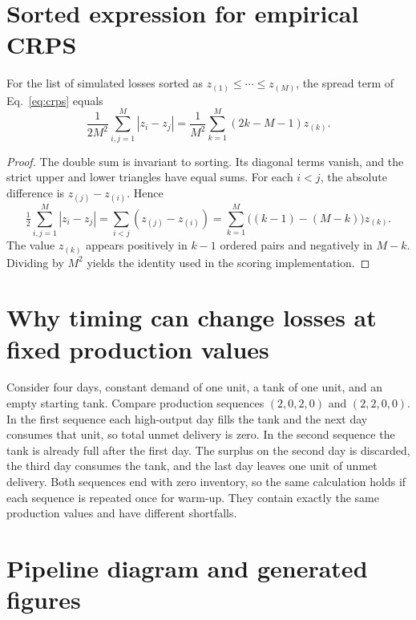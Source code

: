 \section{Sorted expression for empirical CRPS}
\label{app:crps}

\begin{proposition}
For the list of simulated losses sorted as $z_{(1)}\leq\cdots\leq z_{(M)}$, the spread term of Eq.~\eqref{eq:crps} equals
\[
\frac{1}{2M^2}\sum_{i,j=1}^{M}|z_i-z_j|
=\frac{1}{M^2}\sum_{k=1}^{M}(2k-M-1)z_{(k)}.
\]
\end{proposition}

\begin{proof}
The double sum is invariant to sorting. Its diagonal terms vanish, and the strict upper and lower triangles have equal sums. For each $i<j$, the absolute difference is $z_{(j)}-z_{(i)}$. Hence
\[
\tfrac12\sum_{i,j=1}^M |z_i-z_j|
=\sum_{i<j}(z_{(j)}-z_{(i)})
=\sum_{k=1}^{M}\bigl((k-1)-(M-k)\bigr)z_{(k)}.
\]
The value $z_{(k)}$ appears positively in $k-1$ ordered pairs and negatively in $M-k$. Dividing by $M^2$ yields the identity used in the scoring implementation.
\end{proof}

\section{Why timing can change losses at fixed production values}
\label{app:timing}
Consider four days, constant demand of one unit, a tank of one unit, and an empty starting tank. Compare production sequences $(2,0,2,0)$ and $(2,2,0,0)$. In the first sequence each high-output day fills the tank and the next day consumes that unit, so total unmet delivery is zero. In the second sequence the tank is already full after the first day. The surplus on the second day is discarded, the third day consumes the tank, and the last day leaves one unit of unmet delivery. Both sequences end with zero inventory, so the same calculation holds if each sequence is repeated once for warm-up. They contain exactly the same production values and have different shortfalls.

\clearpage
\section{Pipeline diagram and generated figures}
\label{app:figures}

